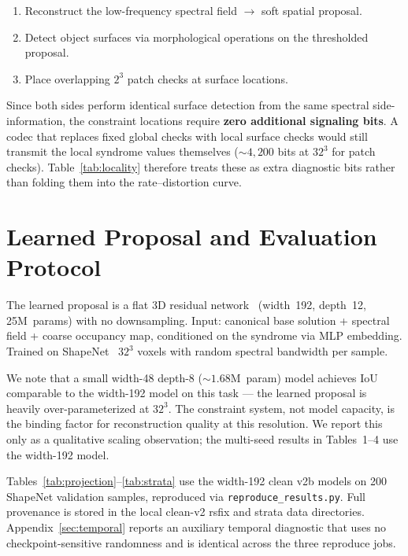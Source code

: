 \documentclass[11pt,a4paper]{article}
\begin{document}
\begin{enumerate}[nosep]
  \item Reconstruct the low-frequency spectral field $\to$ soft spatial proposal.
  \item Detect object surfaces via morphological operations on the
    thresholded proposal.
  \item Place overlapping $2^3$ patch checks at surface locations.
\end{enumerate}

Since both sides perform identical surface detection from the same spectral
side-information, the constraint locations require \textbf{zero additional
signaling bits}. A codec that replaces fixed global checks with local surface
checks would still transmit the local syndrome values themselves
(${\sim}4{,}200$ bits at $32^3$ for patch checks). Table~\ref{tab:locality}
therefore treats these as extra diagnostic bits rather than folding them into
the rate--distortion curve.

\section{Learned Proposal and Evaluation Protocol}

The learned proposal is a flat 3D residual network~\cite{resnet}
(width~192, depth~12, 25M~params) with no downsampling. Input:
canonical base solution + spectral field + coarse occupancy map, conditioned
on the syndrome via MLP embedding. Trained on ShapeNet~\cite{3dr2n2}
$32^3$ voxels with random spectral bandwidth per sample.

We note that a small width-48 depth-8 (${\sim}1.68$M~param) model achieves
IoU comparable to the width-192 model on this task --- the learned
proposal is heavily over-parameterized at $32^3$. The constraint system,
not model capacity, is the binding factor for reconstruction quality at
this resolution. We report this only as a qualitative scaling
observation; the multi-seed results in Tables~1--4 use the width-192
model.

Tables~\ref{tab:projection}--\ref{tab:strata} use the width-192
clean v2b models on 200 ShapeNet validation samples, reproduced via
\texttt{reproduce\_results.py}. Full provenance is stored in the local
clean-v2 rsfix and strata data directories. Appendix~\ref{sec:temporal}
reports an auxiliary temporal diagnostic that uses no checkpoint-sensitive
randomness and is identical across the three reproduce jobs.
\end{document}

